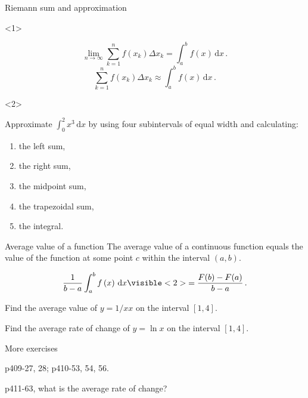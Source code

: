\begin{frame}{Riemann sum and approximation}

\begin{onlyenv}<1>


\[
\lim_{n\to\infty}\sum_{k=1}^{n}f\left(x_{k}\right)\Delta x_{k}=\int_{a}^{b}f\left(x\right)\,\mathrm{d}x\,.
\]
\[
\sum_{k=1}^{n}f\left(x_{k}\right)\Delta x_{k}\approx\int_{a}^{b}f\left(x\right)\,\mathrm{d}x\,.
\]


\end{onlyenv}



\begin{onlyenv}<2>

\begin{example}
Approximate $\int_{0}^{2}x^{3}\,\mathrm{d}x$ by using four subintervals
of equal width and calculating:
\begin{enumerate}
\item the left sum,
\item the right sum,
\item the midpoint sum,
\item the trapezoidal sum,
\item the integral.
\end{enumerate}

\end{example}

\end{onlyenv}

\end{frame}

\begin{frame}{Average value of a function}
The average value of a \alert{continuous} function equals the value
of the function at some point $c$ within the interval $(a,b)$.

\[
\frac{1}{b-a}\int_{a}^{b}f\left(x\right)\,\mathrm{d}x
\visible<2>{=\frac{F(b)-F(a)}{b-a}\,.}
\]
\pause
\begin{example}
Find the average value of $y=1/x x$ on the interval $[1,4]$.
\end{example}
\pause
\begin{example}
Find the average rate of change of $y=\ln x$ on the interval $[1,4]$.
\end{example}

\end{frame}

\begin{frame}{More exercises}

\begin{example}
p409-27, 28; p410-53, 54, 56.
\end{example}

\begin{example}
p411-63, what is the average rate of change?
\end{example}

\end{frame}



